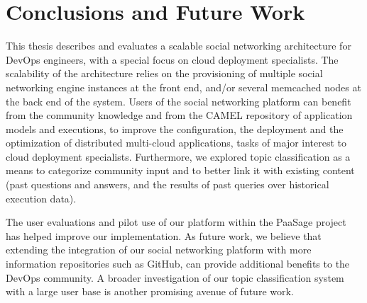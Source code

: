 \chapter{Conclusions and Future Work}
\label{sec:conclusions}
This thesis describes and evaluates a scalable social networking architecture for DevOps engineers, with a special focus on cloud deployment specialists. The scalability of the architecture relies on the provisioning of multiple social networking engine instances at the front end, and/or several memcached nodes at the back end of the system. Users of the social networking platform can benefit from the community knowledge and from the CAMEL repository of application models and executions, to improve the configuration, the deployment and the
optimization of distributed multi-cloud applications, tasks of major interest to cloud deployment specialists. 
Furthermore, we explored topic classification as a means to categorize community input and to better link it with existing content (past questions  and answers, and the results of past queries over historical execution data).

The user evaluations and pilot use of our platform within the PaaSage project has helped improve our implementation. As future work, we believe that extending the integration of our social networking platform with more information repositories such as GitHub, can provide additional benefits to the DevOps community.  A broader investigation of our topic classification system with a large user base is another promising avenue of future work.